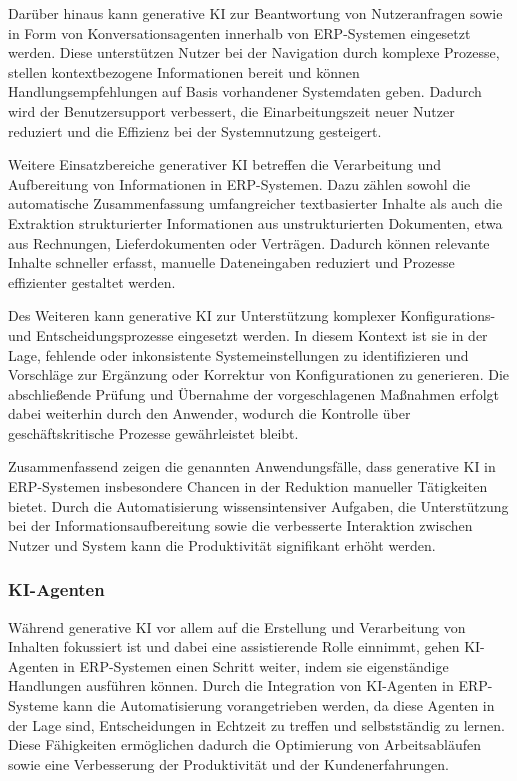 Darüber hinaus kann generative \ac{KI} zur Beantwortung von Nutzeranfragen sowie in Form von Konversationsagenten innerhalb von \ac{ERP}-Systemen eingesetzt werden. Diese unterstützen Nutzer bei der Navigation durch komplexe Prozesse, stellen kontextbezogene Informationen bereit und können Handlungsempfehlungen auf Basis vorhandener Systemdaten geben. Dadurch wird der Benutzersupport verbessert, die Einarbeitungszeit neuer Nutzer reduziert und die Effizienz bei der Systemnutzung gesteigert. \cite[]{sarferaz_implementing_2025}

Weitere Einsatzbereiche generativer \ac{KI} betreffen die Verarbeitung und Aufbereitung von Informationen in \ac{ERP}-Systemen. Dazu zählen sowohl die automatische Zusammenfassung umfangreicher textbasierter Inhalte als auch die Extraktion strukturierter Informationen aus unstrukturierten Dokumenten, etwa aus Rechnungen, Lieferdokumenten oder Verträgen. Dadurch können relevante Inhalte schneller erfasst, manuelle Dateneingaben reduziert und Prozesse effizienter gestaltet werden. \cite[]{sarferaz_implementing_2025}

Des Weiteren kann generative \ac{KI} zur Unterstützung komplexer Konfigurations- und Entscheidungsprozesse eingesetzt werden. In diesem Kontext ist sie in der Lage, fehlende oder inkonsistente Systemeinstellungen zu identifizieren und Vorschläge zur Ergänzung oder Korrektur von Konfigurationen zu generieren. Die abschließende Prüfung und Übernahme der vorgeschlagenen Maßnahmen erfolgt dabei weiterhin durch den Anwender, wodurch die Kontrolle über geschäftskritische Prozesse gewährleistet bleibt. \cite[]{sarferaz_implementing_2025}

Zusammenfassend zeigen die genannten Anwendungsfälle, dass generative \ac{KI} in \ac{ERP}-Systemen insbesondere Chancen in der Reduktion manueller Tätigkeiten bietet. Durch die Automatisierung wissensintensiver Aufgaben, die Unterstützung bei der Informationsaufbereitung sowie die verbesserte Interaktion zwischen Nutzer und System kann die Produktivität signifikant erhöht werden.

\subsubsection{KI-Agenten}
Während generative \ac{KI} vor allem auf die Erstellung und Verarbeitung von Inhalten fokussiert ist und dabei eine assistierende Rolle einnimmt, gehen \ac{KI}-Agenten in \ac{ERP}-Systemen einen Schritt weiter, indem sie eigenständige Handlungen ausführen können. Durch die Integration von \ac{KI}-Agenten in \ac{ERP}-Systeme kann die Automatisierung vorangetrieben werden, da diese Agenten in der Lage sind, Entscheidungen in Echtzeit zu treffen und selbstständig zu lernen. Diese Fähigkeiten ermöglichen dadurch die Optimierung von Arbeitsabläufen sowie eine Verbesserung der Produktivität und der Kundenerfahrungen. \cite[]{gujar_role_2025}

